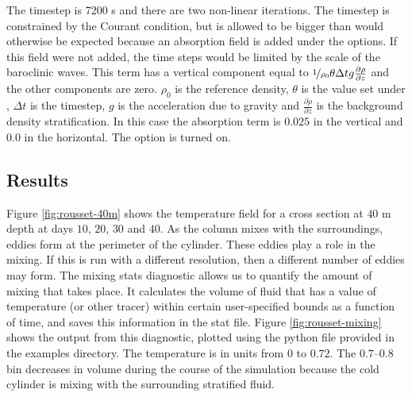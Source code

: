 The timestep is 7200 s and there are two non-linear iterations.  The timestep is constrained by the Courant condition, but is allowed to be bigger than would otherwise be expected because an absorption field is added under the  options.  If this field were not added, the time steps would be limited by the scale of the baroclinic waves.  This term has a vertical component equal to  ${\nicefrac{1}{\rho_0}} {\theta} {\Delta} {t} {g} {\frac{\partial \rho}{\partial z}}$ and the other components are zero. $\rho_0$ is the reference density, $\theta$ is the value set under , ${\Delta} {t} $ is the timestep, $g$ is the acceleration due to gravity and $\frac{\partial \rho}{\partial z}$ is the background density stratification.   In this case the absorption term is $0.025$ in the vertical and $0.0$ in the horizontal. The  option is turned on. 

\subsection{Results}

Figure \ref{fig:rousset-40m} shows the temperature field for a cross section at $40$ m depth at days $10$, $20$, $30$ and $40$. As the column mixes with the surroundings, eddies form at the perimeter of the cylinder. These eddies play a role in the mixing. If this is run with a different resolution, then a different number of eddies may form. The mixing stats diagnostic allows us to quantify the amount of mixing that takes place. It calculates the volume of fluid that has a value of temperature (or other tracer) within certain user-specified bounds as a function of time, and saves this information in the stat file. Figure \ref{fig:rousset-mixing} shows the output from this diagnostic, plotted using the python file provided in the examples directory. The temperature is in units from $0$ to $0.72$. The $0.7$--$0.8$ bin decreases in volume during the course of the simulation because the cold cylinder is mixing with the surrounding stratified fluid.


